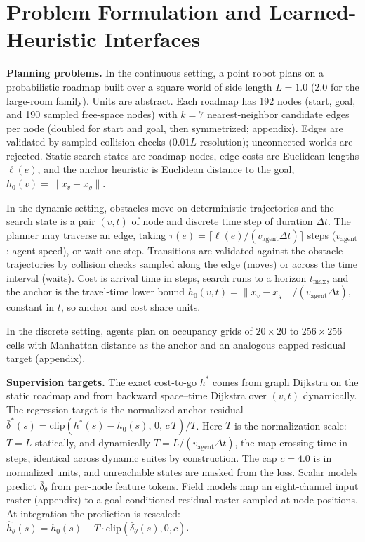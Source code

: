 \documentclass[letterpaper]{article} %
\begin{document}
\section{Problem Formulation and Learned-Heuristic Interfaces}

\textbf{Planning problems.} In the continuous setting, a point robot plans on a probabilistic roadmap \citep[PRM;][]{kavraki1996prm} built over a square world of side length $L{=}1.0$ ($2.0$ for the large-room family). Units are abstract. Each roadmap has 192 nodes (start, goal, and 190 sampled free-space nodes) with $k{=}7$ nearest-neighbor candidate edges per node (doubled for start and goal, then symmetrized; appendix). Edges are validated by sampled collision checks ($0.01L$ resolution); unconnected worlds are rejected. Static search states are roadmap nodes, edge costs are Euclidean lengths $\ell(e)$, and the anchor heuristic is Euclidean distance to the goal, $h_0(v) = \lVert x_v - x_g \rVert$.

In the dynamic setting, obstacles move on deterministic trajectories and the search state is a pair $(v,t)$ of node and discrete time step of duration $\Delta t$. The planner may traverse an edge, taking $\tau(e) = \lceil \ell(e) / (v_{\mathrm{agent}} \Delta t) \rceil$ steps ($v_{\mathrm{agent}}$: agent speed), or wait one step. Transitions are validated against the obstacle trajectories by collision checks sampled along the edge (moves) or across the time interval (waits). Cost is arrival time in steps, search runs to a horizon $t_{\max}$, and the anchor is the travel-time lower bound $h_0(v,t) = \lVert x_v - x_g \rVert / (v_{\mathrm{agent}} \Delta t)$, constant in $t$, so anchor and cost share units.

In the discrete setting, agents plan on occupancy grids of $20{\times}20$ to $256{\times}256$ cells with Manhattan distance as the anchor and an analogous capped residual target (appendix).

\textbf{Supervision targets.} The exact cost-to-go $h^{*}$ comes from graph Dijkstra on the static roadmap and from backward space--time Dijkstra over $(v,t)$ dynamically. The regression target is the normalized anchor residual $\bar\delta^{*}(s) = \mathrm{clip}\!\left(h^{*}(s) - h_0(s),\, 0,\, c\,T\right)/T$. Here $T$ is the normalization scale: $T{=}L$ statically, and dynamically $T = L/(v_{\mathrm{agent}}\Delta t)$, the map-crossing time in steps, identical across dynamic suites by construction. The cap $c{=}4.0$ is in normalized units, and unreachable states are masked from the loss. Scalar models predict $\bar\delta_\theta$ from per-node feature tokens. Field models map an eight-channel input raster (appendix) to a goal-conditioned residual raster sampled at node positions. At integration the prediction is rescaled: $\hat h_\theta(s) = h_0(s) + T \cdot \mathrm{clip}(\bar\delta_\theta(s), 0, c)$.
\end{document}
